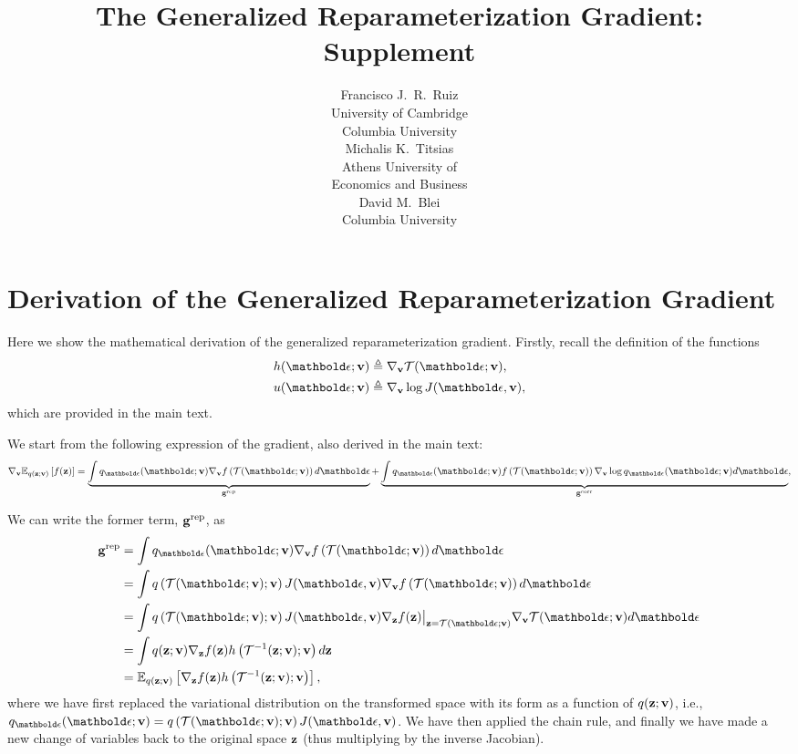 \documentclass{article}
\title{The Generalized Reparameterization Gradient:\\Supplement}
\author{
  Francisco J.~R.~Ruiz\\
  University of Cambridge\\
  Columbia University\\
  \And
  Michalis K.~Titsias\\
  Athens University of\\Economics and Business\\
  \And
  David M.~Blei\\
  Columbia University\\
}
\begin{document}
\maketitle

\section{Derivation of the Generalized Reparameterization Gradient}

Here we show the mathematical derivation of the generalized reparameterization gradient. Firstly, recall the definition of the functions 
\begin{align}
    & \hfun(\beps;\bv)\triangleq \nabla_{\bv} \Tcal(\beps;\bv), \\
    & \ufun(\beps;\bv)\triangleq \nabla_{\bv} \log J(\beps,\bv),
\end{align}
which are provided in the main text.

We start from the following expression of the gradient, also derived in the main text:
\begin{equation}
    \nabla_{\bv} \E{q(\bz;\bv)}{f(\bz)} = \underbrace{\int q_{\beps}(\beps;\bv)\nabla_{\bv}f\left(\Tcal(\beps;\bv)\right)d\beps}_{\bg^{\textrm{rep}}} +
    \underbrace{\int q_{\beps}(\beps;\bv)f\left(\Tcal(\beps;\bv)\right)\nabla_{\bv} \log q_{\beps}(\beps;\bv) d\beps}_{\bg^{\textrm{corr}}},
\end{equation}

We can write the former term, $\mathbf{g}^{\textrm{rep}}$, as
\begin{align}
    \bg^{\textrm{rep}} & = \int q_{\beps}(\beps;\bv)\nabla_{\bv}f\left(\Tcal(\beps;\bv)\right)d\beps \\ 
    & = \int q\left(\Tcal(\beps;\bv);\bv\right)J(\beps,\bv) \nabla_{\bv}f\left(\Tcal(\beps;\bv)\right)d\beps \\
    & = \int q\left(\Tcal(\beps;\bv);\bv\right)J(\beps,\bv) \nabla_{\bz}f(\bz)\big|_{\bz=\Tcal(\beps;\bv)} \nabla_{\bv} \Tcal(\beps;\bv)d\beps \\
    & = \int q(\bz;\bv) \nabla_{\bz}f(\bz) \hfun\left( \Tcal^{-1}(\bz;\bv);\bv \right) d\bz \\
    & = \E{q(\bz;\bv)}{\nabla_{\bz}f(\bz) \hfun\left( \Tcal^{-1}(\bz;\bv);\bv \right)},
\end{align}
where we have first replaced the variational distribution on the transformed space with its form as a function of $q(\mathbf{z};\mathbf{v})$, i.e., $q_{\beps}(\beps;\bv) = q\left(\Tcal(\beps;\bv);\bv\right)J(\beps,\bv)$. We have then applied the chain rule, and finally we have made a new change of variables back to the original space $\mathbf{z}$ (thus multiplying by the inverse Jacobian).
\end{document}
